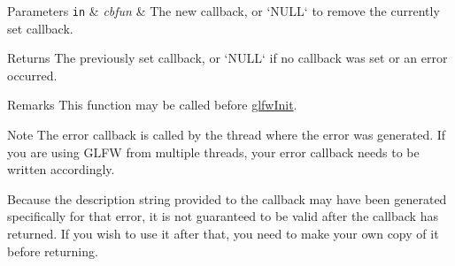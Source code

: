 \begin{DoxyParams}[1]{\-Parameters}
\mbox{\tt in}  & {\em cbfun} & \-The new callback, or `\-N\-U\-L\-L` to remove the currently set callback. \\
\hline
\end{DoxyParams}
\begin{DoxyReturn}{\-Returns}
\-The previously set callback, or `\-N\-U\-L\-L` if no callback was set or an error occurred.
\end{DoxyReturn}
\begin{DoxyRemark}{\-Remarks}
\-This function may be called before \hyperlink{group__init_gab41771f0215a2e0afb4cf1cf98082d40}{glfw\-Init}.
\end{DoxyRemark}
\begin{DoxyNote}{\-Note}
\-The error callback is called by the thread where the error was generated. \-If you are using \-G\-L\-F\-W from multiple threads, your error callback needs to be written accordingly.

\-Because the description string provided to the callback may have been generated specifically for that error, it is not guaranteed to be valid after the callback has returned. \-If you wish to use it after that, you need to make your own copy of it before returning. 
\end{DoxyNote}
